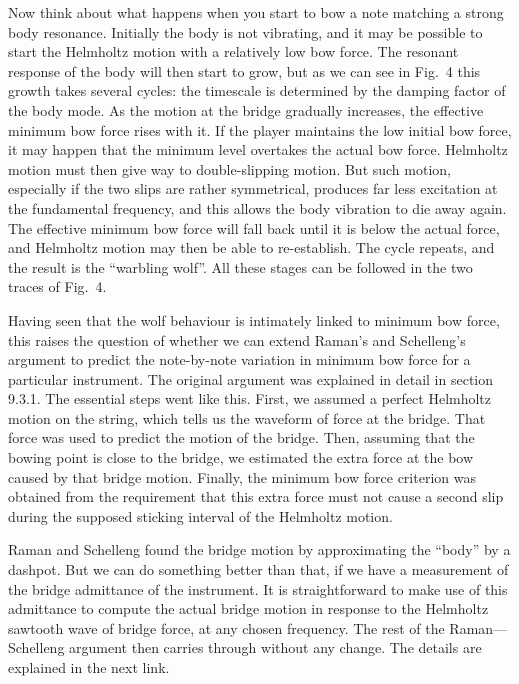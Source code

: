   Now think about what happens when you start to bow a note matching a strong 
  body resonance. Initially the body is not vibrating, and it may be possible 
  to start the Helmholtz motion with a relatively low bow force. The resonant 
  response of the body will then start to grow, but as we can see in Fig.\ 4 
  this growth takes several cycles: the timescale is determined by the damping 
  factor of the body mode. As the motion at the bridge gradually increases, the 
  effective minimum bow force rises with it. If the player maintains the low 
  initial bow force, it may happen that the minimum level overtakes the actual 
  bow force. Helmholtz motion must then give way to double-slipping motion. But 
  such motion, especially if the two slips are rather symmetrical, produces far 
  less excitation at the fundamental frequency, and this allows the body 
  vibration to die away again. The effective minimum bow force will fall back 
  until it is below the actual force, and Helmholtz motion may then be able to 
  re-establish. The cycle repeats, and the result is the “warbling wolf”. All 
  these stages can be followed in the two traces of Fig.\ 4. 

  Having seen that the wolf behaviour is intimately linked to minimum bow 
  force, this raises the question of whether we can extend Raman’s and 
  Schelleng’s argument to predict the note-by-note variation in minimum bow 
  force for a particular instrument. The original argument was explained in 
  detail in section 9.3.1. The essential steps went like this. First, we 
  assumed a perfect Helmholtz motion on the string, which tells us the waveform 
  of force at the bridge. That force was used to predict the motion of the 
  bridge. Then, assuming that the bowing point is close to the bridge, we 
  estimated the extra force at the bow caused by that bridge motion. Finally, 
  the minimum bow force criterion was obtained from the requirement that this 
  extra force must not cause a second slip during the supposed sticking 
  interval of the Helmholtz motion. 

  Raman and Schelleng found the bridge motion by approximating the “body” by a 
  dashpot. But we can do something better than that, if we have a measurement 
  of the bridge admittance of the instrument. It is straightforward to make use 
  of this admittance to compute the actual bridge motion in response to the 
  Helmholtz sawtooth wave of bridge force, at any chosen frequency. The rest of 
  the Raman—Schelleng argument then carries through without any change. The 
  details are explained in the next link. 

